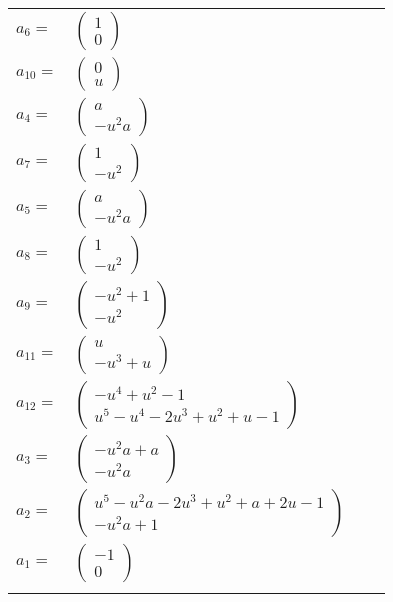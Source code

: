 \documentclass[1p]{elsarticle_modified}
\theoremstyle{definition}
\begin{document}
\begin{tabular}{m{7pt} m{180pt} m{7pt} m{180pt} }
\flushright $a_{6}=$&$\begin{pmatrix}1\\0\end{pmatrix}$ \\
\flushright $a_{10}=$&$\begin{pmatrix}0\\u\end{pmatrix}$ \\
\flushright $a_{4}=$&$\begin{pmatrix}a\\- u^2 a\end{pmatrix}$ \\
\flushright $a_{7}=$&$\begin{pmatrix}1\\- u^2\end{pmatrix}$ \\
\flushright $a_{5}=$&$\begin{pmatrix}a\\- u^2 a\end{pmatrix}$ \\
\flushright $a_{8}=$&$\begin{pmatrix}1\\- u^2\end{pmatrix}$ \\
\flushright $a_{9}=$&$\begin{pmatrix}- u^2+1\\- u^2\end{pmatrix}$ \\
\flushright $a_{11}=$&$\begin{pmatrix}u\\- u^3+u\end{pmatrix}$ \\
\flushright $a_{12}=$&$\begin{pmatrix}- u^4+u^2-1\\u^5- u^4-2 u^3+u^2+u-1\end{pmatrix}$ \\
\flushright $a_{3}=$&$\begin{pmatrix}- u^2 a+a\\- u^2 a\end{pmatrix}$ \\
\flushright $a_{2}=$&$\begin{pmatrix}u^5- u^2 a-2 u^3+u^2+a+2 u-1\\- u^2 a+1\end{pmatrix}$ \\
\flushright $a_{1}=$&$\begin{pmatrix}-1\\0\end{pmatrix}$\\&\end{tabular}
\end{document}
